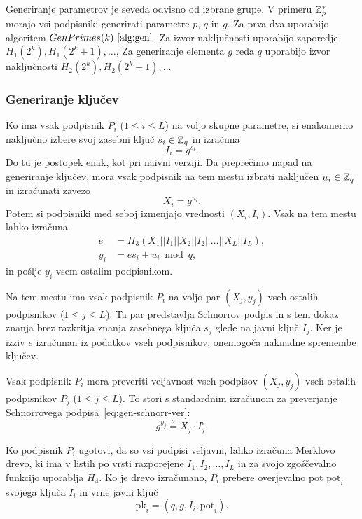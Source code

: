 \begin{primer}
    Generiranje parametrov je seveda odvisno od izbrane grupe. V primeru $\mathbb Z_p^*$ morajo vsi podpisniki
    generirati parametre $p$, $q$ in $g$. Za prva dva uporabijo algoritem $GenPrimes(k)~\ref{alg:gen}$.
    Za izvor naključnosti uporabijo zaporedje $H_1(2^k), H_1(2^k + 1), \dots$, Za generiranje elementa
    $g$ reda $q$ uporabijo izvor naključnosti $H_2(2^k), H_2(2^k + 1), \dots$
\end{primer}

\subsubsection{Generiranje ključev}
Ko ima vsak podpisnik $P_i$ ($1 \le i \le L$) na voljo skupne parametre, si enakomerno naključno
izbere svoj zasebni ključ $s_i \in \mathbb Z_q$ in izračuna
$$ 
I_i = g^{s_i}.
$$
Do tu je postopek enak, kot pri naivni verziji. Da preprečimo napad na generiranje ključev, mora
vsak podpisnik na tem mestu izbrati naključen $u_i \in \mathbb Z_q$ in izračunati zavezo
$$
X_i = g^{u_i}.
$$
Potem si podpisniki med seboj izmenjajo vrednosti $(X_i, I_i)$. Vsak na tem mestu lahko izračuna
\begin{align*}
    e &= H_3(X_1 || I_1 || X_2 || I_2 || \dots || X_L || I_L), \\
    y_i &= e s_i + u_i \bmod q,
\end{align*}
in pošlje $y_i$ vsem ostalim podpisnikom.

Na tem mestu ima vsak podpisnik $P_i$ na voljo par $(X_j, y_j)$ vseh ostalih podpisnikov ($1 \le j
\le L$). Ta par predstavlja Schnorrov podpis in s tem dokaz znanja brez razkritja znanja zasebnega
ključa $s_j$ glede na javni ključ $I_j$. Ker je izziv $e$ izračunan iz podatkov vseh podpisnikov,
onemogoča naknadne spremembe ključev.

Vsak podpisnik $P_i$ mora preveriti veljavnost vseh podpisov $(X_j, y_j)$ vseh ostalih podpisnikov
$P_j$ ($1 \le j \le L$). To stori s standardnim izračunom za preverjanje Schnorrovega
podpisa~\eqref{eq:gen-schnorr-ver}:
$$
g^{y_j} \stackrel{?}{=} X_j \cdot I_j^{e}.
$$

Ko podpisnik $P_i$ ugotovi, da so vsi podpisi veljavni, lahko izračuna Merklovo drevo, ki ima v
listih po vrsti razporejene $I_1, I_2, \dots, I_L$ in za svojo zgoščevalno funkcijo uporablja $H_4$.
Ko je drevo izračunano, $P_i$ prebere overjevalno pot $\text{pot}_i$ svojega ključa $I_i$ in vrne
javni ključ
$$ 
\text{pk}_i = (q, g, I_i, \text{pot}_i).
$$

